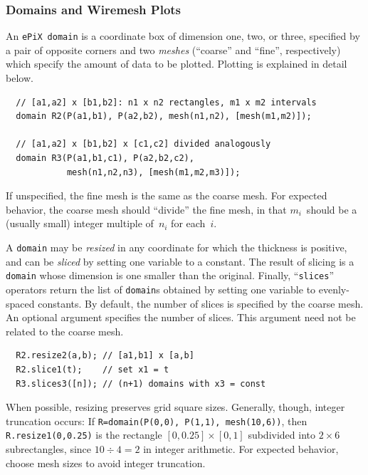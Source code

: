 \documentclass[12pt,letterpaper]{book}
\newcommand{\code}[1]{\texttt{#1}}
\newcommand{\ePiX}{\code{ePiX}}
\newcommand{\teximath}[1]{$#1$}
\newcommand{\findex}[1]{\ignorespaces}
\begin{document}
\subsubsection*{Domains and Wiremesh Plots}

An \ePiX\ \code{domain} is a coordinate box of dimension one, two, or
three, specified by a pair of opposite corners and two \emph{meshes}
(``coarse'' and ``fine'', respectively) which specify the amount of
data to be plotted. Plotting is explained in detail below.
\findex{domain}
\begin{verbatim}
  // [a1,a2] x [b1,b2]: n1 x n2 rectangles, m1 x m2 intervals
  domain R2(P(a1,b1), P(a2,b2), mesh(n1,n2), [mesh(m1,m2)]);

  // [a1,a2] x [b1,b2] x [c1,c2] divided analogously
  domain R3(P(a1,b1,c1), P(a2,b2,c2),
            mesh(n1,n2,n3), [mesh(m1,m2,m3)]);
\end{verbatim}
If unspecified, the fine mesh is the same as the coarse mesh. For
expected behavior, the coarse mesh should ``divide'' the fine mesh, in
that \teximath{m_i}~should be a (usually small) integer multiple
of~\teximath{n_i} for each~\teximath{i}.

A \code{domain} may be \emph{resized} in any coordinate for which the
thickness is positive, and can be \emph{sliced} by setting one
variable to a constant. The result of slicing is a \code{domain} whose
dimension is one smaller than the original.  Finally,
``\code{slices}'' operators return the list of \code{domain}s obtained
by setting one variable to evenly-spaced constants.  By default, the
number of slices is specified by the coarse mesh. An optional argument
specifies the number of slices. This argument need not be related to
the coarse mesh.
\findex{domain.resize}
\findex{domain.slice}
\findex{domain.slices}
\begin{verbatim}
  R2.resize2(a,b); // [a1,b1] x [a,b]
  R2.slice1(t);    // set x1 = t
  R3.slices3([n]); // (n+1) domains with x3 = const
\end{verbatim}
\begin{center}
  
\end{center}
\smallskip
When possible, resizing preserves grid square sizes. Generally,
though, integer truncation occurs: If \code{R=domain(P(0,0), P(1,1),
mesh(10,6))}, then \code{R.resize1(0,0.25)} is the rectangle
\teximath{[0,0.25]\times[0,1]} subdivided into \teximath{2\times6}
subrectangles, since \teximath{10\div4=2} in integer arithmetic. For
expected behavior, choose mesh sizes to avoid integer truncation.
\end{document}
